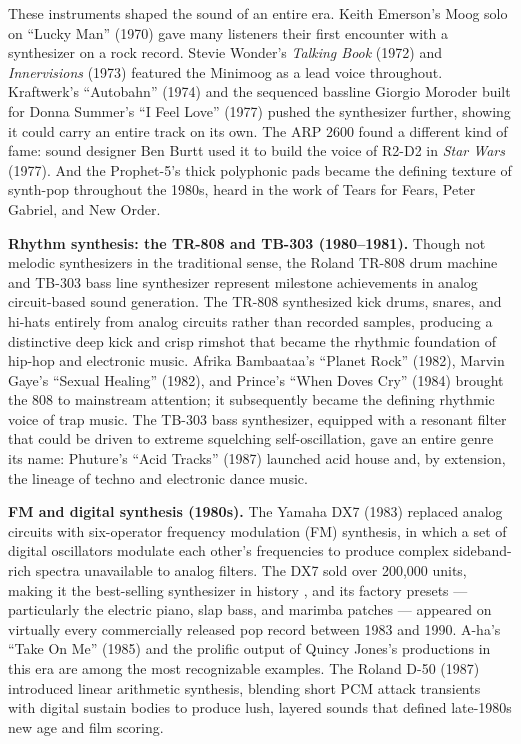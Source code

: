\par \vspace{0.3cm}

\noindent These instruments shaped the sound of an entire era. Keith Emerson's Moog solo on ``Lucky Man'' (1970) gave many listeners their first encounter with a synthesizer on a rock record. Stevie Wonder's \textit{Talking Book} (1972) and \textit{Innervisions} (1973) featured the Minimoog as a lead voice throughout. Kraftwerk's ``Autobahn'' (1974) and the sequenced bassline Giorgio Moroder built for Donna Summer's ``I Feel Love'' (1977) pushed the synthesizer further, showing it could carry an entire track on its own. The ARP 2600 found a different kind of fame: sound designer Ben Burtt used it to build the voice of R2-D2 in \textit{Star Wars} (1977). And the Prophet-5's thick polyphonic pads became the defining texture of synth-pop throughout the 1980s, heard in the work of Tears for Fears, Peter Gabriel, and New Order.

\par \vspace{0.3cm}

\noindent \textbf{Rhythm synthesis: the TR-808 and TB-303 (1980--1981).} Though not melodic synthesizers in the traditional sense, the Roland TR-808 drum machine and TB-303 bass line synthesizer represent milestone achievements in analog circuit-based sound generation. The TR-808 synthesized kick drums, snares, and hi-hats entirely from analog circuits rather than recorded samples, producing a distinctive deep kick and crisp rimshot that became the rhythmic foundation of hip-hop and electronic music. Afrika Bambaataa's ``Planet Rock'' (1982), Marvin Gaye's ``Sexual Healing'' (1982), and Prince's ``When Doves Cry'' (1984) brought the 808 to mainstream attention; it subsequently became the defining rhythmic voice of trap music. The TB-303 bass synthesizer, equipped with a resonant filter that could be driven to extreme squelching self-oscillation, gave an entire genre its name: Phuture's ``Acid Tracks'' (1987) launched acid house and, by extension, the lineage of techno and electronic dance music.

\par \vspace{0.3cm}

\noindent \textbf{FM and digital synthesis (1980s).} The Yamaha DX7 (1983) replaced analog circuits with six-operator frequency modulation (FM) synthesis, in which a set of digital oscillators modulate each other's frequencies to produce complex sideband-rich spectra unavailable to analog filters. The DX7 sold over 200,000 units, making it the best-selling synthesizer in history \cite{roads1996computer}, and its factory presets --- particularly the electric piano, slap bass, and marimba patches --- appeared on virtually every commercially released pop record between 1983 and 1990. A-ha's ``Take On Me'' (1985) and the prolific output of Quincy Jones's productions in this era are among the most recognizable examples. The Roland D-50 (1987) introduced linear arithmetic synthesis, blending short PCM attack transients with digital sustain bodies to produce lush, layered sounds that defined late-1980s new age and film scoring.

